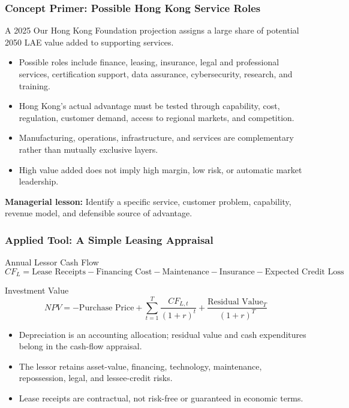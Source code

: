 \documentclass{beamer}
\begin{document}
\begin{frame}[t]
\frametitle{Concept Primer: Possible Hong Kong Service Roles}
A 2025 Our Hong Kong Foundation projection assigns a large share of potential 2050 LAE value added to supporting services.
\begin{itemize}
\item Possible roles include finance, leasing, insurance, legal and professional services, certification support, data assurance, cybersecurity, research, and training.
\item Hong Kong's actual advantage must be tested through capability, cost, regulation, customer demand, access to regional markets, and competition.
\item Manufacturing, operations, infrastructure, and services are complementary rather than mutually exclusive layers.
\item High value added does not imply high margin, low risk, or automatic market leadership.
\end{itemize}
\textbf{Managerial lesson:} Identify a specific service, customer problem, capability, revenue model, and defensible source of advantage.
\end{frame}

\begin{frame}[t]
\frametitle{Applied Tool: A Simple Leasing Appraisal}
\begin{block}{Annual Lessor Cash Flow}
\[
CF_L=\text{Lease Receipts}-\text{Financing Cost}-\text{Maintenance}-\text{Insurance}-\text{Expected Credit Loss}
\]
\end{block}
\begin{block}{Investment Value}
\[
NPV=-\text{Purchase Price}+\sum_{t=1}^{T}\frac{CF_{L,t}}{(1+r)^t}+\frac{\text{Residual Value}_T}{(1+r)^T}
\]
\end{block}
\begin{itemize}
\item Depreciation is an accounting allocation; residual value and cash expenditures belong in the cash-flow appraisal.
\item The lessor retains asset-value, financing, technology, maintenance, repossession, legal, and lessee-credit risks.
\item Lease receipts are contractual, not risk-free or guaranteed in economic terms.
\end{itemize}
\end{frame}
\end{document}

